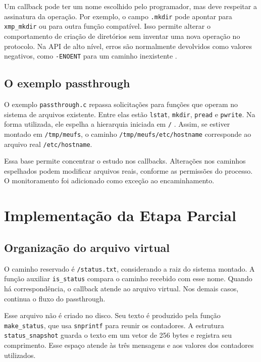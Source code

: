 \documentclass[12pt]{article}
\begin{document}
Um callback pode ter um nome escolhido pelo programador, mas deve
respeitar a assinatura da operação. Por exemplo, o campo \texttt{.mkdir}
pode apontar para \texttt{xmp\_mkdir} ou para outra função compatível.
Isso permite alterar o comportamento de criação de diretórios sem
inventar uma nova operação no protocolo. Na API de alto nível, erros
são normalmente devolvidos como valores negativos, como
\texttt{-ENOENT} para um caminho inexistente \cite{operacoes}.

\subsection{O exemplo passthrough}

O exemplo \texttt{passthrough.c} repassa solicitações para funções que
operam no sistema de arquivos existente. Entre elas estão
\texttt{lstat}, \texttt{mkdir}, \texttt{pread} e \texttt{pwrite}.
Na forma utilizada, ele espelha a hierarquia iniciada em \texttt{/}
\cite{passthrough}. Assim, se estiver montado em \texttt{/tmp/meufs},
o caminho \texttt{/tmp/meufs/etc/hostname} corresponde ao arquivo real
\texttt{/etc/hostname}.

Essa base permite concentrar o estudo nos callbacks. Alterações nos
caminhos espelhados podem modificar arquivos reais, conforme as permissões
do processo. O monitoramento foi adicionado como exceção ao encaminhamento.

\section{Implementação da Etapa Parcial}

\subsection{Organização do arquivo virtual}

O caminho reservado é \texttt{/status.txt}, considerando a raiz do
sistema montado. A função auxiliar \texttt{is\_status} compara o caminho
recebido com esse nome. Quando há correspondência, o callback atende
ao arquivo virtual. Nos demais casos, continua o fluxo do passthrough.

Esse arquivo não é criado no disco. Seu texto é produzido pela função
\texttt{make\_status}, que usa \texttt{snprintf} para reunir os contadores.
A estrutura \texttt{status\_snapshot} guarda o texto em um vetor de
256 bytes e registra seu comprimento. Esse espaço atende às três
mensagens e aos valores dos contadores utilizados.
\end{document}
